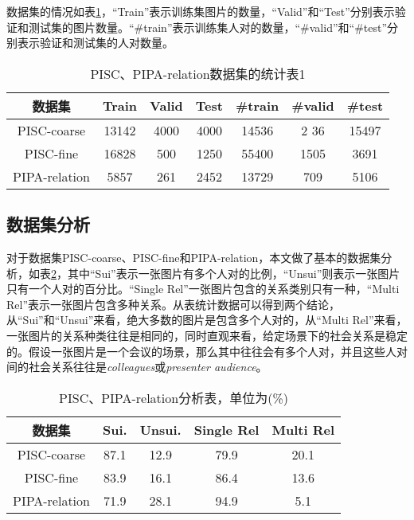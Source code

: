 数据集的情况如表\ref{tab:exp-sta-one}，``Train''表示训练集图片的数量，``Valid''和``Test''分别表示验证和测试集的图片数量。``\#train''表示训练集人对的数量，``\#valid''和``\#test''分别表示验证和测试集的人对数量。
\begin{table}[htpb]
  \centering
  \caption{PISC、PIPA-relation数据集的统计表1}
  \label{tab:exp-sta-one}
  \setlength{\tabcolsep}{4.5mm}
  \begin{tabular}{c|c|c|c|c|c|c}
    \toprule
    数据集 & Train & Valid & Test & \#train  &  \#valid &  \#test  \\
    \midrule
    PISC-coarse & 13142 & 4000 & 4000 & 14536 & 2
    36 & 15497   \\
    \midrule
    PISC-fine &  16828 & 500 & 1250 & 55400 & 1505 & 3691 \\
    \midrule
    PIPA-relation & 5857 & 261 & 2452 & 13729 & 709 & 5106 \\
    \bottomrule
  \end{tabular}
\end{table}

\subsection{数据集分析} \label{sec:exp-dataset-ana}

对于数据集PISC-coarse、PISC-fine和PIPA-relation，本文做了基本的数据集分析，如表\ref{tab:exp-sta-two}，其中``Sui''表示一张图片有多个人对的比例，``Unsui''则表示一张图片只有一个人对的百分比。``Single Rel''一张图片包含的关系类别只有一种，``Multi Rel''表示一张图片包含多种关系。从表统计数据可以得到两个结论，从``Sui''和``Unsui''来看，绝大多数的图片是包含多个人对的，从``Multi Rel''来看，一张图片的关系种类往往是相同的，同时直观来看，给定场景下的社会关系是稳定的。假设一张图片是一个会议的场景，那么其中往往会有多个人对，并且这些人对间的社会关系往往是{\it colleagues}或{\it presenter audience}。
\begin{table}[htpb]
  \centering
  \caption{PISC、PIPA-relation分析表，单位为(\%)}
  \label{tab:exp-sta-two}
  \begin{tabular}{c|c|c|c|c}
    \toprule
    数据集 & Sui. & Unsui. & Single Rel & Multi Rel \\
    \midrule
    PISC-coarse  & 87.1 & 12.9 & 79.9 & 20.1 \\
    \midrule
    PISC-fine  & 83.9 & 16.1 & 86.4 & 13.6 \\
    \midrule
    PIPA-relation & 71.9 & 28.1 & 94.9 & 5.1 \\
    \bottomrule
  \end{tabular}
\end{table}

